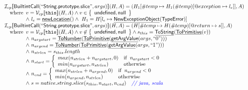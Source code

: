 \documentclass{article}
\makeatletter
\newcommand{\SF}[1]{\mbox{\textsf{#1}}}
\newcommand{\TT}[1]{\mbox{\texttt{#1}}}
\newcommand{\comment}[1]{\textit{#1}}
\newcommand{\wherec}[1]{{\rm where}\begin{array}[t]{l}#1\end{array}}
\newcommand{\ifc}[1]{{\rm if}\begin{array}[t]{l}#1\end{array}}
\newcommand{\owc}{{\rm otherwise}}
\newcommand{\I}{\mathcal{I}}
\newcommand{\V}{\mathcal{V}}
\newcommand{\set}[1]{\left\{\begin{array}{l}#1\end{array}\right\}}
\newcommand{\lbr}{\llbracket}
\newcommand{\rbr}{\rrbracket}
\newcommand{\hf}[1]{\underline{\sf #1}}
\newcommand{\varloc}[1]{\##1}
\newcommand{\varprop}[1]{@#1}
\def\inblue{\color{blue}}
\def\inblue{\color{blue}}
\makeatother
\begin{document}
\[\begin{array}{l}
  
\I _{cp}\lbr \SF{BuiltintCall}(``\SF{String.prototype.slice}",args)\rbr(H,A)
 = (H_1[\varloc{temp}\mapsto H_1(\varloc{temp})[\varprop{exception}\mapsto l_e]], A) \\
\quad\wherec{
  v = \V _{cp}\lbr \TT{this}\rbr (H,A) \land v \in \set{\SF{undefined}, \SF{null}}\\
  \land\ l_e = \hf{newLocation}() \land\ H_1=H[l_e\mapsto\hf{NewExceptionObject}(\SF{TypeError})] 
  }\\
  
\I _{cp}\lbr \SF{BuiltintCall}(``\SF{String.prototype.slice}",args)\rbr(H,A)
 = (H[\varloc{temp}\mapsto H(\varloc{temp})[\varprop{return}\mapsto s]], A) \\
\quad\wherec{
  v = \V _{cp}\lbr \TT{this}\rbr (H,A) \land v \not\in \set{\SF{undefined}, \SF{null}}
  \land s_{this} = \hf{ToString}(\hf{ToPrimitive}(v))\\
  \land\ n_{argstart} = \hf{ToNumber}(\hf{ToPrimitive}(\hf{getArgValue}(args, ``0")))\\
  \land\ n_{argend} = \hf{ToNumber}(\hf{ToPrimitive}(\hf{getArgValue}(args, ``1")))\\
  \land\ n_{strlen} = s_{this}.length\\
  \land\ n_{start} = \left\{\begin{array}{ll}
      max(n_{strlen} + n_{argstart}, 0) & \ifc{n_{argstart} < 0} \\
      min(n_{argstart}, n_{strlen}) &  \owc
    \end{array}\right.\\
  \land\ n_{end} = \left\{\begin{array}{ll}
      max(n_{strlen} + n_{argend}, 0) & \ifc{n_{argend} < 0} \\
      min(n_{argend}, n_{strlen}) &  \owc
    \end{array}\right.\\
  \land\ s = native.string.slice(s_{this}, n_{start},n_{end}) \quad\comment{{\inblue // java, scala}}\\
  }\\
\end{array}
\]
\end{document}
